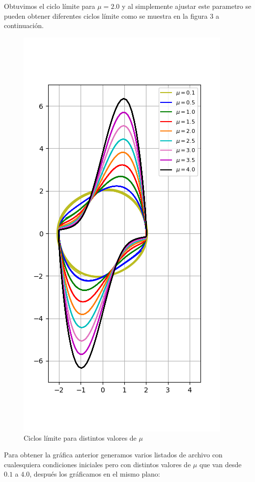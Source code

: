 \documentclass{article}
\begin{document}
Obtuvimos el ciclo límite para $\mu=2.0$ y al simplemente ajustar este parametro se pueden obtener diferentes ciclos límite como se muestra en la figura 3 a continuación.
\begin{figure}[ht!]
\centering
\includegraphics[width=0.42\linewidth]{fig3.png}
\caption{Ciclos límite para distintos valores de $\mu$}
\end{figure}

\newpage

Para obtener la gráfica anterior generamos varios listados de archivo con cualesquiera condiciones iniciales pero con distintos valores de $\mu$ que van desde $0.1$ a $4.0$, después los gráficamos en el mismo plano:
\end{document}
